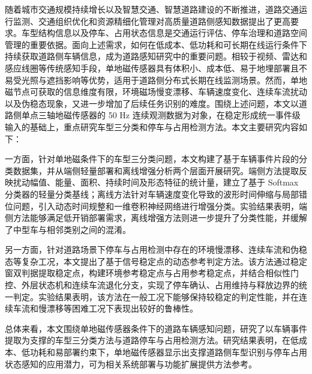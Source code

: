 随着城市交通规模持续增长以及智慧交通、智慧道路建设的不断推进，道路交通运行监测、交通组织优化和资源精细化管理对高质量道路侧感知数据提出了更高要求。车型结构信息以及停车、占用状态信息是交通运行评估、停车治理和道路空间管理的重要依据。面向上述需求，如何在低成本、低功耗和可长期在线运行条件下持续获取道路侧车辆信息，成为道路感知研究中的重要问题。相较于视频、雷达和感应线圈等传统感知手段，单地磁传感器具有体积小、成本低、易于地埋部署且不易受光照与遮挡影响等优势，适用于道路侧分布式长期在线监测场景。然而，单地磁节点可获取的信息维度有限，环境磁场慢变漂移、车辆速度变化、连续车流扰动以及伪稳态现象，又进一步增加了后续任务识别的难度。围绕上述问题，本文以道路侧单点三轴地磁传感器的 50 Hz 连续观测数据为对象，在稳定形成统一事件级输入的基础上，重点研究车型三分类和停车与占用检测方法。本文主要研究内容如下：

一方面，针对单地磁条件下的车型三分类问题，本文构建了基于车辆事件片段的分类数据集，并从端侧轻量部署和离线增强分析两个层面开展研究。端侧方法提取反映扰动幅值、能量、面积、持续时间及形态特征的统计量，建立了基于 Softmax 分类器的轻量分类基线；离线方法针对车辆速度变化导致的波形时间伸缩与局部错位问题，引入动态时间规整和一维卷积神经网络进行增强分类。实验结果表明，端侧方法能够满足低开销部署需求，离线增强方法则进一步提升了分类性能，并缓解了中型车与相邻类别之间的混淆。

另一方面，针对道路场景下停车与占用检测中存在的环境慢漂移、连续车流和伪稳态等复杂工况，本文提出了基于信号稳定点的动态参考判定方法。该方法通过稳定窗双判据提取稳定点，构建环境参考稳定点与占用参考稳定点，并结合相似性门控、外层状态机和连续车流退化分支，实现了停车确认、占用维持与释放边界的统一判定。实验结果表明，该方法在一般工况下能够保持较稳定的判定性能，并在连续车流和慢漂移等困难工况下表现出较好的鲁棒性。

总体来看，本文围绕单地磁传感器条件下的道路车辆感知问题，研究了以车辆事件提取为支撑的车型三分类方法与道路停车与占用检测方法。研究结果表明，在低成本、低功耗和易部署约束下，单地磁传感器显示出支撑道路侧车型识别与停车占用状态感知的应用潜力，可为相关系统部署与功能扩展提供方法参考。
